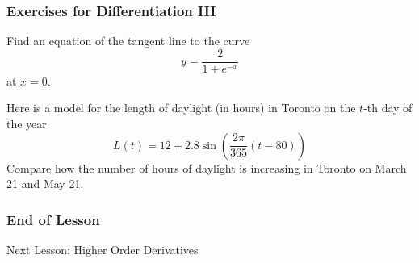 \documentclass[xcolor=dvipsnames]{beamer}
\begin{document}
\begin{frame}
  \frametitle{Exercises for Differentiation III}
Find an equation of the tangent line to the curve
\begin{equation}
  \label{eq:vaixohga}
  y=\frac{2}{1+e^{-x}}
\end{equation}
at $x=0$.

\bigskip

Here is a model for the length of daylight (in hours) in Toronto on
the $t$-th day of the year
\begin{equation}
  \label{eq:iefeuvae}
  L(t)=12+2.8\sin\left(\frac{2\pi}{365}(t-80)\right)
\end{equation}
Compare how the number of hours of daylight is increasing in Toronto
on March 21 and May 21.
\end{frame}

\begin{frame}
  \frametitle{End of Lesson}
Next Lesson: Higher Order Derivatives
\end{frame}
\end{document}
